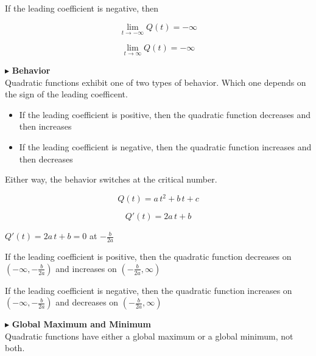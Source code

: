 \documentclass{ximera}
\begin{document}
If the leading coefficient is negative, then 


\[
\lim\limits_{t \to -\infty} Q(t) = -\infty
\]

\[
\lim\limits_{t \to \infty} Q(t) = -\infty
\]









$\blacktriangleright$ \textbf{\textcolor{red!10!blue!90!}{Behavior}} \\


Quadratic functions exhibit one of two types of behavior.   Which one depends on the sign of the leading coefficent.  


\begin{itemize}
  \item If the leading coefficient is positive, then the quadratic function decreases and then increases
  \item If the leading coefficient is negative, then the quadratic function increases and then decreases
\end{itemize}

Either way, the behavior switches at the critical number.


\[
Q(t) = a \, t^2 + b \, t + c
\]


\[
Q'(t) = 2a \, t + b
\]


$Q'(t) = 2a \, t + b = 0$ at $-\frac{b}{2a}$




If the leading coefficient is positive, then the quadratic function decreases on $\left( -\infty, -\frac{b}{2a} \right)$ and increases on $\left( -\frac{b}{2a}, \infty \right)$





If the leading coefficient is negative, then the quadratic function increases on $\left( -\infty, -\frac{b}{2a} \right)$ and decreases on $\left( -\frac{b}{2a}, \infty \right)$














$\blacktriangleright$  \textbf{\textcolor{red!10!blue!90!}{Global Maximum and Minimum}} \\

Quadratic functions have either a global maximum or a global minimum, not both.
\end{document}
